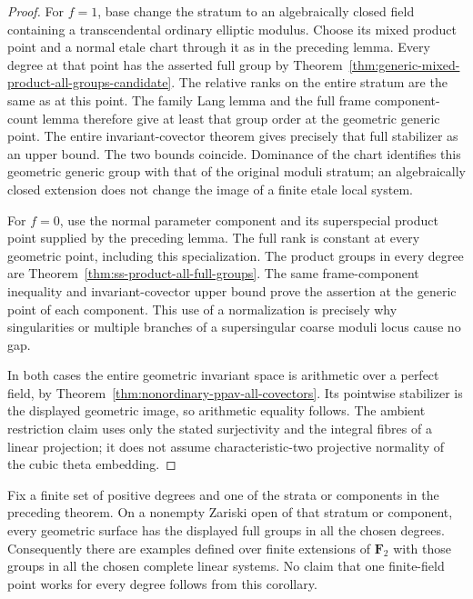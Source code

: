 \begin{proof}
For $f=1$, base change the stratum to an algebraically
closed field containing a transcendental ordinary elliptic
modulus. Choose its mixed product point and a normal
etale chart through it as in the preceding lemma.
Every degree at that point has the asserted full group
by Theorem~\ref{thm:generic-mixed-product-all-groups-candidate}.
The relative ranks on the entire stratum are the same as
at this point. The family Lang lemma and the full frame
component-count lemma therefore give at least that group
order at the geometric generic point. The entire
invariant-covector theorem gives precisely that full
stabilizer as an upper bound. The two bounds coincide.
Dominance of the chart identifies this geometric generic
group with that of the original moduli stratum; an
algebraically closed extension does not change the image
of a finite etale local system.

For $f=0$, use the normal parameter component and its
superspecial product point supplied by the preceding
lemma. The full rank is constant at every geometric
point, including this specialization. The product groups
in every degree are Theorem~\ref{thm:ss-product-all-full-groups}.
The same frame-component inequality and invariant-covector
upper bound prove the assertion at the generic point of
each component. This use of a normalization is precisely
why singularities or multiple branches of a supersingular
coarse moduli locus cause no gap.

In both cases the entire geometric invariant space is
arithmetic over a perfect field, by
Theorem~\ref{thm:nonordinary-ppav-all-covectors}.
Its pointwise stabilizer is the displayed geometric image,
so arithmetic equality follows. The ambient restriction
claim uses only the stated surjectivity and the integral
fibres of a linear projection; it does not assume
characteristic-two projective normality of the cubic
theta embedding.
\end{proof}

\begin{corollary}
\label{cor:generic-nonordinary-ppav-finite-degrees-candidate}
Fix a finite set of positive degrees and one of the strata
or components in the preceding theorem. On a nonempty
Zariski open of that stratum or component, every geometric
surface has the displayed full groups in all the chosen
degrees. Consequently there are examples defined over
finite extensions of $\mathbf F_2$ with those groups in
all the chosen complete linear systems.
No claim that one finite-field point works for every
degree follows from this corollary.
\end{corollary}

